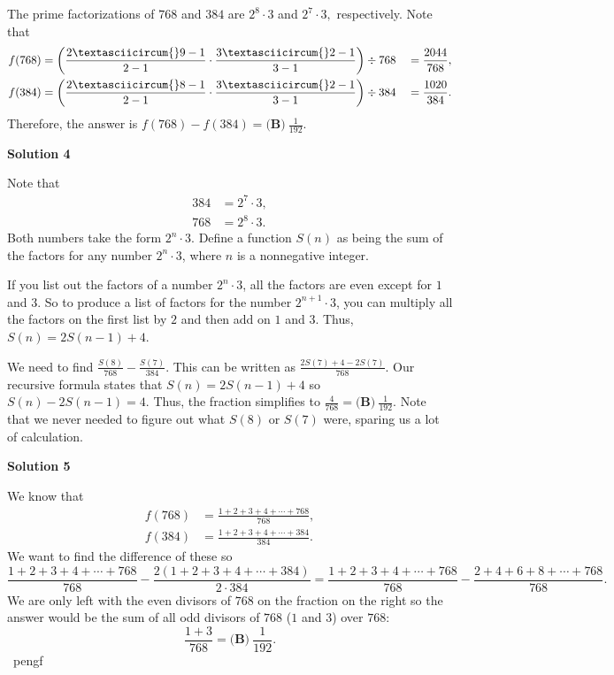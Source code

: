 \begin{enumerate}
 The prime factorizations of $768$ and $384$ are $2^8\cdot3$ and $2^7\cdot3,$ respectively. Note that
 \begin{alignat*}{8} f(768) &= \left(\frac{2\textasciicircum{}9-1}{2-1}\cdot\frac{3\textasciicircum{}2-1}{3-1}\right)\div768 &&= \frac{2044}{768}, \\ f(384) &= \left(\frac{2\textasciicircum{}8-1}{2-1}\cdot\frac{3\textasciicircum{}2-1}{3-1}\right)\div384 &&= \frac{1020}{384}. \end{alignat*}Therefore, the answer is $f(768)-f(384)=\boxed{\textbf{(B)}\ \frac{1}{192}}.$




\textbf{Solution 4}

Note that
 \begin{align*} 384 &= 2^7\cdot3, \\ 768 &= 2^8\cdot3. \end{align*}
Both numbers take the form $2^n\cdot3$. Define a function $S(n)$ as being the sum of the factors for any number $2^n\cdot3$, where $n$ is a nonnegative integer.

 If you list out the factors of a number $2^n\cdot3$, all the factors are even except for $1$ and $3$. So to produce a list of factors for the number $2^{n+1}\cdot3$, you can multiply all the factors on the first list by $2$ and then add on $1$ and $3$. Thus, $S(n) = 2S(n-1) + 4$.

 We need to find $\frac{S(8)}{768} - \frac{S(7)}{384}$. This can be written as $\frac{2S(7)+4-2S(7)}{768}$. Our recursive formula states that $S(n) = 2S(n-1) + 4$ so $S(n) - 2S(n-1) = 4$. Thus, the fraction simplifies to $\frac{4}{768} = \boxed{\textbf{(B)}\ \frac{1}{192}}$. Note that we never needed to figure out what $S(8)$ or $S(7)$ were, sparing us a lot of calculation.

 



\textbf{Solution 5}

We know that
 \begin{align*} f(768) &= \frac{1 + 2 + 3 + 4 + \cdots + 768}{768}, \\ f(384) &= \frac{1 + 2 + 3 + 4 + \cdots + 384}{384}. \end{align*}
We want to find the difference of these so
 \[\frac{1 + 2 + 3 + 4 + \cdots + 768}{768} - \frac{ 2(1 + 2 + 3 + 4 + \cdots + 384)}{2\cdot384} = \frac{1 + 2 + 3 + 4 + \cdots + 768}{768} - \frac{ 2 + 4 + 6 + 8 + \cdots + 768}{768}.\]We are only left with the even divisors of $768$ on the fraction on the right so the answer would be the sum of all odd divisors  of $768$ ($1$ and $3$) over $768$:
 \[\frac{1 + 3}{768}=\boxed{\textbf{(B)}\ \frac{1}{192}}.\]~pengf


\end{enumerate}
